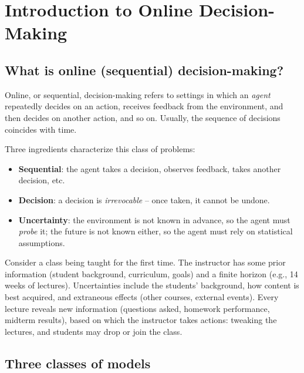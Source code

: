 

\section{Introduction to Online Decision-Making}

\subsection{What is online (sequential) decision-making?}

Online, or sequential, decision-making refers to settings in which an \emph{agent} repeatedly decides on an action, receives feedback from the environment, and then decides on another action, and so on. Usually, the sequence of decisions coincides with time.

Three ingredients characterize this class of problems:
\begin{itemize}
    \item \textbf{Sequential}: the agent takes a decision, observes feedback, takes another decision, etc.
    \item \textbf{Decision}: a decision is \emph{irrevocable} -- once taken, it cannot be undone.
    \item \textbf{Uncertainty}: the environment is not known in advance, so the agent must \emph{probe} it; the future is not known either, so the agent must rely on statistical assumptions.
\end{itemize}

\begin{example}
Consider a class being taught for the first time. The instructor has some prior information (student background, curriculum, goals) and a finite horizon (e.g., 14 weeks of lectures). Uncertainties include the students' background, how content is best acquired, and extraneous effects (other courses, external events). Every lecture reveals new information (questions asked, homework performance, midterm results), based on which the instructor takes actions: tweaking the lectures, and students may drop or join the class.
\end{example}

\subsection{Three classes of models}

